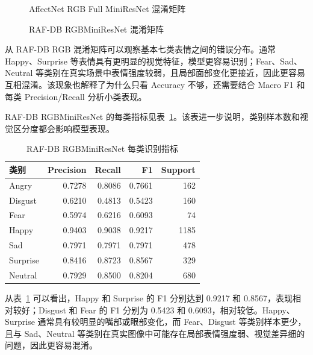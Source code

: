 \documentclass[UTF8,a4paper,12pt]{ctexart}
\newcommand{\figplaceholder}[1]{%
  \begin{center}
    \fbox{\parbox{0.78\textwidth}{\centering #1}}
  \end{center}
}
\begin{document}
\begin{figure}[H]
  \centering
  \figplaceholder{\rule{0pt}{1.2em}}
  \caption{AffectNet RGB Full MiniResNet 混淆矩阵}
  \label{fig:affectnet_confusion_in_results}
\end{figure}

\begin{figure}[H]
  \centering
  \figplaceholder{\rule{0pt}{1.2em}}
  \caption{RAF-DB RGBMiniResNet 混淆矩阵}
  \label{fig:rafdb_confusion_in_results}
\end{figure}

从 RAF-DB RGB 混淆矩阵可以观察基本七类表情之间的错误分布。通常 Happy、Surprise 等表情具有更明显的视觉特征，模型更容易识别；Fear、Sad、Neutral 等类别在真实场景中表情强度较弱，且局部面部变化更接近，因此更容易互相混淆。该现象也解释了为什么只看 Accuracy 不够，还需要结合 Macro F1 和每类 Precision/Recall 分析小类表现。

RAF-DB RGBMiniResNet 的每类指标见表~\ref{tab:rafdb_per_class}。该表进一步说明，类别样本数和视觉区分度都会影响模型表现。

\begin{table}[H]
  \centering
  \caption{RAF-DB RGBMiniResNet 每类识别指标}
  \label{tab:rafdb_per_class}
  \small
  \setlength{\tabcolsep}{6pt}
  \begin{tabular}{lrrrr}
    \toprule
    类别 & Precision & Recall & F1 & Support \\
    \midrule
    Angry & 0.7278 & 0.8086 & 0.7661 & 162 \\
    Disgust & 0.6210 & 0.4813 & 0.5423 & 160 \\
    Fear & 0.5974 & 0.6216 & 0.6093 & 74 \\
    Happy & 0.9403 & 0.9038 & 0.9217 & 1185 \\
    Sad & 0.7971 & 0.7971 & 0.7971 & 478 \\
    Surprise & 0.8416 & 0.8723 & 0.8567 & 329 \\
    Neutral & 0.7929 & 0.8500 & 0.8204 & 680 \\
    \bottomrule
  \end{tabular}
\end{table}

从表~\ref{tab:rafdb_per_class} 可以看出，Happy 和 Surprise 的 F1 分别达到 0.9217 和 0.8567，表现相对较好；Disgust 和 Fear 的 F1 分别为 0.5423 和 0.6093，相对较低。Happy、Surprise 通常具有较明显的嘴部或眼部变化，而 Fear、Disgust 等类别样本更少，且与 Sad、Neutral 等类别在真实图像中可能存在局部表情强度弱、视觉差异细的问题，因此更容易混淆。
\end{document}
